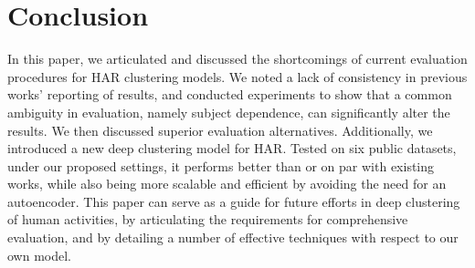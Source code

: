 \documentclass[wcp]{jmlr}
\begin{document}
\section{Conclusion} \label{sec:conlusion}
In this paper, we articulated and discussed the shortcomings of current evaluation procedures for HAR clustering models. We noted a lack of consistency in previous works' reporting of results, and conducted experiments to show that a common ambiguity in evaluation, namely subject dependence, can significantly alter the results. We then discussed superior evaluation alternatives. Additionally, we introduced a new deep clustering model for HAR. Tested on six public datasets, under our proposed settings, it performs better than or on par with existing works, while also being more scalable and efficient by avoiding the need for an autoencoder. 
This paper can serve as a guide for future efforts in deep clustering of human activities, by articulating the requirements for comprehensive evaluation, and by detailing a number of effective techniques with respect to our own model. 


{\small 

}
\end{document}
